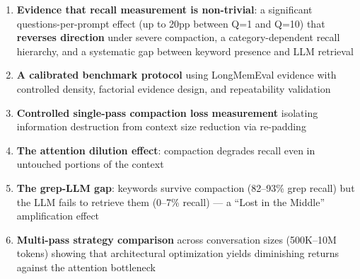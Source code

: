 \begin{enumerate}
  \item \textbf{Evidence that recall measurement is non-trivial}: a significant questions-per-prompt
    effect (up to 20pp between Q=1 and Q=10) that \textbf{reverses direction} under severe
    compaction, a category-dependent recall hierarchy, and a systematic gap between
    keyword presence and LLM retrieval
  \item \textbf{A calibrated benchmark protocol} using LongMemEval evidence with
    controlled density, factorial evidence design, and repeatability validation
  \item \textbf{Controlled single-pass compaction loss measurement} isolating information
    destruction from context size reduction via re-padding
  \item \textbf{The attention dilution effect}: compaction degrades recall even in
    untouched portions of the context
  \item \textbf{The grep-LLM gap}: keywords survive compaction (82--93\% grep recall)
    but the LLM fails to retrieve them (0--7\% recall) --- a ``Lost in the Middle''
    amplification effect
  \item \textbf{Multi-pass strategy comparison} across conversation sizes (500K--10M
    tokens) showing that architectural optimization yields diminishing returns
    against the attention bottleneck
\end{enumerate}
